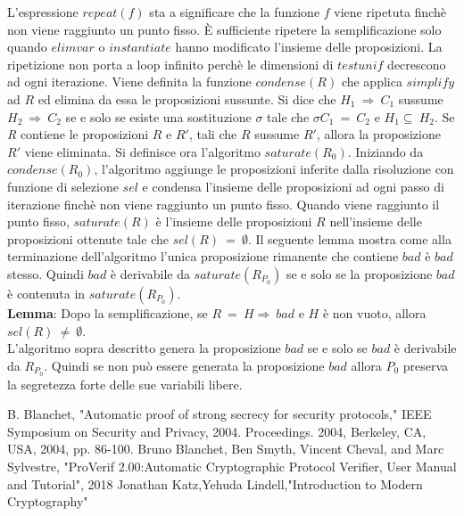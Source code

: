 \documentclass[12pt]{article}
\begin{document}
 L'espressione $repeat(f)$ sta a significare che la funzione $f$ viene ripetuta finchè non viene raggiunto un punto fisso. È sufficiente ripetere la semplificazione solo quando $elimvar$ o $instantiate$ hanno modificato l'insieme delle proposizioni. La ripetizione non porta a loop infinito perchè le dimensioni di $testunif$ decrescono ad ogni iterazione. Viene definita la funzione $condense(R)$ che applica $simplify$ ad $R$ ed elimina da essa le proposizioni sussunte. Si dice che $H_1\ \Rightarrow \ C_1$ sussume $H_2\ \Rightarrow \ C_2$ se e solo se esiste una sostituzione $\sigma$ tale che $\sigma C_1 \ =\ C_2$ e $H_1 \subseteq \ H_2$. Se \textit{R} contiene le proposizioni $R$ e $R'$, tali che $R$ sussume $R'$, allora la proposizione $R'$ viene eliminata. Si definisce ora l'algoritmo $saturate(R_0)$. Iniziando da $condense(R_0)$, l'algoritmo aggiunge le proposizioni inferite dalla risoluzione con funzione di selezione $sel$ e condensa l'insieme delle proposizioni ad ogni passo di iterazione finchè non viene raggiunto un punto fisso. Quando viene raggiunto il punto fisso, $saturate(R)$ è l'insieme delle proposizioni $R$ nell'insieme delle proposizioni ottenute tale che $sel(R)\ =\ \emptyset$. Il seguente lemma mostra come alla terminazione dell'algoritmo l'unica proposizione rimanente che contiene $bad$ è $bad$ stesso. Quindi $bad$ è derivabile da $saturate(R_{P_0})$ se e solo se la proposizione $bad$  è contenuta in $saturate(R_{P_0})$. \\
 
 \textbf{Lemma}: Dopo la semplificazione, se $R\ =\ H \Rightarrow \ bad$ e $H$ è non vuoto, allora $sel(R)\ \neq \ \emptyset$.\\
 
 L'algoritmo sopra descritto genera la proposizione $bad$ se e solo se $bad$ è derivabile da $R_{P_0}$. Quindi se non può essere generata la proposizione $bad$ allora $P_0$ preserva la segretezza forte delle sue variabili libere.
 
 \newpage
 \begin{thebibliography}{}
    B. Blanchet, "Automatic proof of strong secrecy for security protocols," IEEE Symposium on Security and Privacy, 2004. Proceedings. 2004, Berkeley, CA, USA, 2004, pp. 86-100.
    Bruno Blanchet, Ben Smyth, Vincent Cheval, and Marc Sylvestre, "ProVerif 2.00:Automatic Cryptographic Protocol Verifier, User Manual and Tutorial", 2018 
    Jonathan Katz,Yehuda Lindell,"Introduction to Modern Cryptography"
 \end{thebibliography}
 
\end{document}
